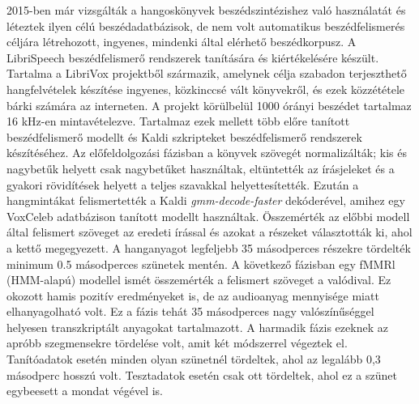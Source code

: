 2015-ben már vizsgálták a hangoskönyvek beszédszintézishez való használatát és léteztek ilyen célú beszédadatbázisok, de nem volt automatikus beszédfelismerés céljára létrehozott, ingyenes, mindenki által elérhető beszédkorpusz. A LibriSpeech beszédfelismerő rendszerek tanítására és kiértékelésére készült. Tartalma a LibriVox projektből származik, amelynek célja szabadon terjeszthető hangfelvételek készítése ingyenes, közkinccsé vált könyvekről, és ezek közzététele bárki számára az interneten.
\newline
\newline
A projekt körülbelül 1000 órányi beszédet tartalmaz 16 kHz-en mintavételezve. Tartalmaz ezek mellett több előre tanított beszédfelismerő modellt és Kaldi szkripteket beszédfelismerő rendszerek készítéséhez.
\newline
\newline
Az előfeldolgozási fázisban a könyvek szövegét normalizálták; kis és nagybetűk helyett csak nagybetűket használtak, eltüntették az írásjeleket és a gyakori rövidítések helyett a teljes szavakkal helyettesítették. Ezután a hangmintákat felismertették a Kaldi \emph{gmm-decode-faster} dekóderével, amihez egy VoxCeleb adatbázison tanított modellt használtak.
\newline
\newline
Összemérték az előbbi modell által felismert szöveget az eredeti írással és azokat a részeket választották ki, ahol a kettő megegyezett. A hanganyagot legfeljebb 35 másodperces részekre tördelték minimum 0.5 másodperces szünetek mentén.
\newline
\newline
A következő fázisban egy fMMRl (HMM-alapú) modellel ismét összemérték a felismert szöveget a valódival. Ez okozott hamis pozitív eredményeket is, de az audioanyag mennyisége miatt elhanyagolható volt. Ez a fázis tehát 35 másodperces nagy valószínűséggel helyesen transzkriptált anyagokat tartalmazott.
\newline
\newline
A harmadik fázis ezeknek az apróbb szegmensekre tördelése volt, amit két módszerrel végeztek el. Tanítóadatok esetén minden olyan szünetnél tördeltek, ahol az legalább 0,3 másodperc hosszú volt. Tesztadatok esetén csak ott tördeltek, ahol ez a szünet egybeesett a mondat végével is.

